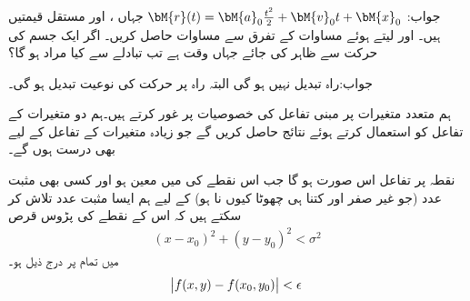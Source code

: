 جواب:
$\bM{r}(t)=\bM{a}_0\tfrac{t^2}{2}+\bM{v}_0t+\bM{x}_0$
جہاں ،  اور  مستقل قیمتیں ہیں۔
 اور  لیتے ہوئے مساوات  کے تفرق  سے مساوات  حاصل کریں۔
اگر ایک جسم کی حرکت  سے ظاہر کی جائے جہاں  وقت ہے تب  تبادلے سے کیا مراد ہو گا؟

جواب:راہ تبدیل نہیں ہو گی البتہ راہ پر حرکت کی نوعیت تبدیل ہو گی۔

ہم متعدد متغیرات پر مبنی تفاعل کی خصوصیات پر غور کرتے ہیں۔ہم دو متغیرات کے تفاعل کو استعمال کرتے ہوئے  نتائج حاصل کریں گے جو زیادہ متغیرات کے تفاعل کے لیے بھی درست ہوں گے۔

نقطہ  پر تفاعل   اس صورت  ہو گا جب اس نقطے کی  میں  معین ہو اور کسی بھی مثبت عدد  (جو غیر صفر اور کتنا ہی چھوٹا کیوں نا ہو) کے لیے ہم ایسا مثبت عدد  تلاش کر سکتے ہیں کہ اس کے نقطے کی پڑوس  قرص 
\begin{align}
(x-x_0)^2+(y-y_0)^2<\sigma^2
\end{align}
میں تمام  پر درج ذیل ہو۔
\begin{align}
\abs{f(x,y)-f(x_0,y_0)}<\epsilon
\end{align}

